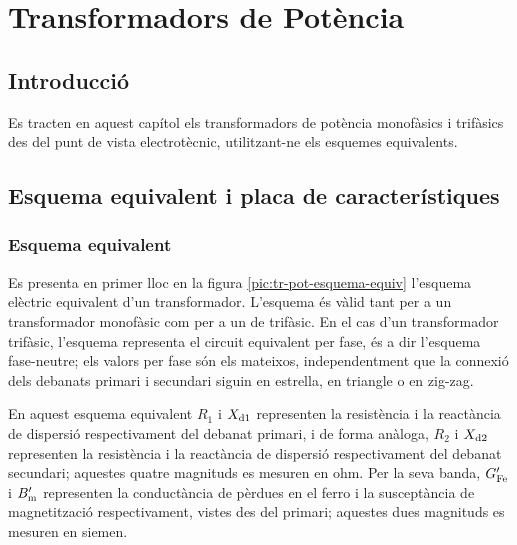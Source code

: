 \chapter{Transformadors de Potència}

\section{Introducció}
Es tracten en aquest capítol els transformadors de potència
monofàsics i trifàsics des del punt de vista electrotècnic, utilitzant-ne els esquemes equivalents.

\section{Esquema equivalent i placa de característiques}

\subsection{Esquema equivalent}

Es presenta en primer lloc en la figura \vref{pic:tr-pot-esquema-equiv} l'esquema elèctric equivalent d'un transformador.
L'esquema és vàlid tant per a un transformador monofàsic com per a un de trifàsic. En el cas d'un transformador trifàsic, l'esquema representa el circuit equivalent per fase, és a dir l'esquema fase-neutre; els valors per fase són els mateixos, independentment que la connexió dels debanats primari i secundari siguin en estrella, en triangle o en zig-zag.

\begin{center}
    
    \label{pic:tr-pot-esquema-equiv}
\end{center}

En aquest esquema equivalent $R_1$ i $X_\mathrm{d1}$ representen la resistència i la reactància de dispersió respectivament del debanat primari, i de forma anàloga, $R_2$ i $X_\mathrm{d2}$ representen la resistència i la reactància de dispersió respectivament del debanat secundari; aquestes quatre magnituds es mesuren en ohm. Per la seva banda, $G_\mathrm{Fe}'$ i $B_\mathrm{m}'$ representen la conductància de pèrdues en el ferro i la susceptància de magnetització respectivament, vistes des del primari; aquestes dues magnituds es mesuren en siemen.

